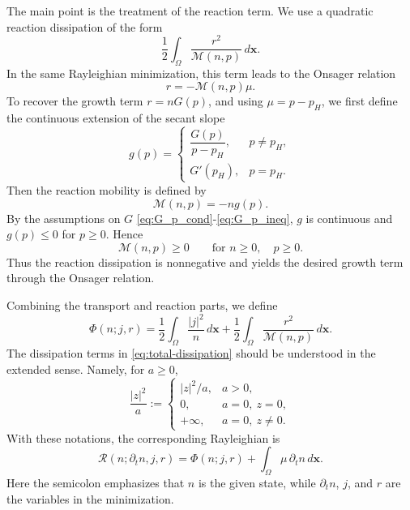 \documentclass[11pt]{article}
\theoremstyle{plain}
\numberwithin{equation}{section}
\begin{document}
The main point is the treatment of the reaction term. We use a quadratic
reaction dissipation of the form
\[
    \frac12\int_\Omega \frac{r^2}{\mathcal M(n,p)}\,d\mathbf{x} .
\]
In the same Rayleighian minimization, this term leads to the Onsager
relation
\[
    r=-\mathcal M(n,p)\mu .
\]
To recover the growth term \(r=nG(p)\), and using \(\mu=p-p_H\), we first
define the continuous extension of the secant slope
\begin{equation}\label{eq:g-secant}
    g(p)
    =
    \begin{cases}
    \dfrac{G(p)}{p-p_H}, & p\ne p_H,\\[1.2ex]
    G'(p_H), & p=p_H .
    \end{cases}
\end{equation}
Then the reaction mobility is defined by
\begin{equation}\label{eq:reaction-mobility}
    \mathcal M(n,p)
    =
    -n g(p).
\end{equation}
By the assumptions on \(G\) \eqref{eq:G_p_cond}-\eqref{eq:G_p_ineq}, \(g\) is continuous and \(g(p)\le0\) for
\(p\ge0\). Hence
\[
    \mathcal M(n,p)\ge0
    \qquad \text{for } n\ge0,\quad p\ge0 .
\]
Thus the reaction dissipation is nonnegative and yields the desired growth
term through the Onsager relation.

Combining the transport and reaction parts, we define
\begin{equation}\label{eq:total-dissipation}
    \Phi(n;j,r)
    =
    \frac12\int_\Omega \frac{|j|^2}{n}\,d\mathbf{x}
    +
    \frac12\int_\Omega \frac{r^2}{\mathcal M(n,p)}\,d\mathbf{x} .
\end{equation}
The dissipation terms in \eqref{eq:total-dissipation} should be understood in
the extended sense. Namely, for \(a\ge0\),
\[
    \frac{|z|^2}{a}
    :=
    \begin{cases}
    |z|^2/a, & a>0,\\
    0, & a=0,\ z=0,\\
    +\infty, & a=0,\ z\ne0 .
    \end{cases}
\]
With these notations, the corresponding Rayleighian is
\begin{equation}\label{eq:rayleighian}
    \mathcal R(n;\partial_t n,j,r)
    =
    \Phi(n;j,r)
    +
    \int_\Omega \mu\,\partial_t n\,d\mathbf{x} .
\end{equation}
Here the semicolon emphasizes that \(n\) is the given state, while
\(\partial_t n\), \(j\), and \(r\) are the variables in the minimization.
\end{document}
